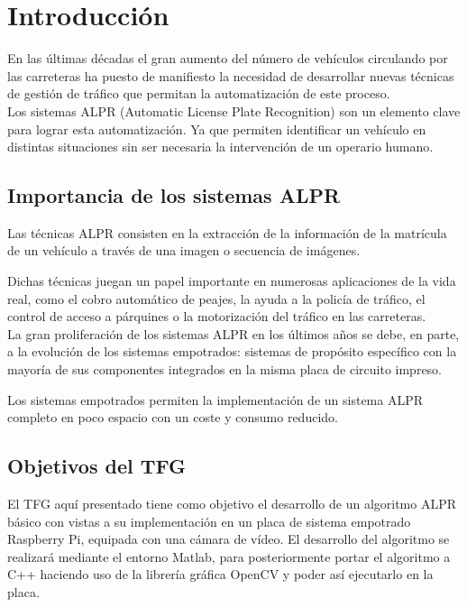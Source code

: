 \chapter{Introducción}
En las últimas décadas el gran aumento del número de vehículos circulando por las carreteras ha puesto de manifiesto la necesidad de desarrollar nuevas técnicas de gestión de tráfico que permitan la automatización de este proceso.\\

Los sistemas \ac{ALPR} (Automatic License Plate Recognition) son un elemento clave para lograr esta automatización. Ya que permiten identificar un vehículo en distintas situaciones sin ser necesaria la intervención de un operario humano.

\section{Importancia de los sistemas \acs{ALPR}}
Las técnicas \acs{ALPR} consisten en la extracción de la información de la matrícula de un vehículo a través de una imagen o secuencia de imágenes. 

Dichas técnicas juegan un papel importante en numerosas aplicaciones de la vida real, como el cobro automático de peajes, la ayuda a la policía de tráfico, el control de acceso a párquines o la motorización del tráfico en las carreteras. \cite{IEEEtrans}\\

La gran proliferación de los sistemas \ac{ALPR} en los últimos años se debe, en parte, a la evolución de los sistemas empotrados: sistemas de propósito específico con la mayoría de sus componentes integrados en la misma placa de circuito impreso. \cite{ wiki1}

Los sistemas empotrados permiten la implementación de un sistema \acs{ALPR} completo en poco espacio con un coste y consumo reducido. 

\section{Objetivos del \acf{TFG}}
El \ac{TFG} aquí presentado tiene como objetivo el desarrollo de un algoritmo \acs{ALPR} básico con vistas a su implementación en un placa de sistema empotrado Raspberry Pi, equipada con una cámara de vídeo. El desarrollo del algoritmo se realizará mediante el entorno Matlab, para posteriormente portar el algoritmo a C++ haciendo uso de la librería gráfica OpenCV y poder así ejecutarlo en la placa.

